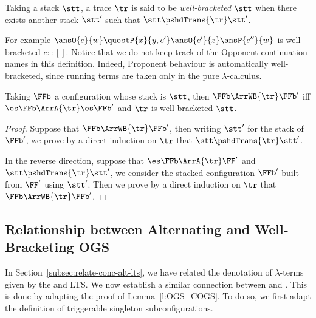 \begin{definition}
Taking a stack $\stt$,
a trace $\tr$ is said to be \emph{well-bracketed} \wrt $\stt$ when
there exists another stack $\stt'$ such that
$\stt \pshdTrans{\tr} \stt'$.
\end{definition}
%
For example $\ansO{c}{w} \questP{x}{y,c'} \ansO{c'}{z} \ansP{c''}{w}$
is well-bracketed \wrt $c::[]$.
Notice that we do not keep track of the Opponent continuation names in this definition.
Indeed, Proponent behaviour is automatically well-bracketed,
since running terms are taken only in the pure $\lambda$-calculus.

\begin{lemma}
\label{l:WBs_lts}
Taking $\FFb$ a configuration whose stack is $\stt$, then
$\FFb \ArrWB{\tr} \FFb'$ iff 
$\es \FFb \ArrA{\tr} \es \FFb'$ and $\tr$ is well-bracketed \wrt $\stt$.
\end{lemma} 

\begin{proof}
  Suppose that $\FFb \ArrWB{\tr} \FFb'$,
  then writing $\stt'$ for the stack of $\FFb'$,
  we prove by a direct induction on $\tr$ that $\stt \pshdTrans{\tr} \stt'$.

  In the reverse direction, suppose that 
  $\es \FFb \ArrA{\tr} \FF'$ and $\stt \pshdTrans{\tr} \stt'$,
  we consider the stacked configuration $\FFb'$ built 
  from $\FF'$ using $\stt'$.
  Then we prove by a direct induction on $\tr$ that
  $\FFb \ArrWB{\tr} \FFb'$.
\end{proof}

\subsection{Relationship between Alternating and Well-Bracketing OGS}
\label{subsec:relate-alt-wb-lts}

In Section~\ref{subsec:relate-conc-alt-lts},
we have related the denotation of $\lambda$-terms
given by the \COGS and \AOGS LTS.
We now establish a similar connection
between \AOGS and \WBOGS.
This is done by adapting the proof of Lemma~\ref{l:OGS_COGS}.
To do so, we first adapt the definition of
triggerable singleton subconfigurations.


